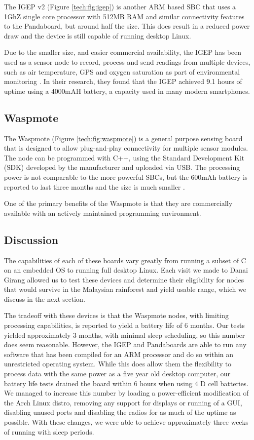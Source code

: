 The IGEP v2 (Figure \ref{tech:fig:igep}) is another ARM based SBC that uses a 1GhZ single core processor with 512MB RAM and similar connectivity features to the Pandaboard, but around half the size. This does result in a reduced power draw and the device is still capable of running desktop Linux.

Due to the smaller size, and easier commercial availability, the IGEP has been used as a sensor node to record, process and send readings from multiple devices, such as air temperature, GPS and oxygen saturation as part of environmental monitoring \cite{Resch}. In their research, they found that the IGEP achieved 9.1 hours of uptime using a 4000mAH battery, a capacity used in many modern smartphones.

\subsection{Waspmote}\label{tech:waspmote}
The Waspmote (Figure \ref{tech:fig:waspmote}) is a general purpose sensing board that is designed to allow plug-and-play connectivity for multiple sensor modules. The node can be programmed with C++, using the Standard Development Kit (SDK) developed by the manufacturer and uploaded via USB. The processing power is not comparable to the more powerful SBCs, but the 600mAh battery is reported to last three months and the size is much smaller \cite{waspmote}.

One of the primary benefits of the Waspmote is that they are commercially available with an actively maintained programming environment.

\subsection{Discussion} \label{tech:hw:conc}
The capabilities of each of these boards vary greatly from running a subset of C on an embedded OS to running full desktop Linux. Each visit we made to Danai Girang allowed us to test these devices and determine their eligibility for nodes that would survive in the Malaysian rainforest and yield usable range, which we discuss in the next section.

The tradeoff with these devices is that the Waspmote nodes, with limiting processing capabilities, is reported to yield a battery life of 6 months. Our tests yielded approximately 3 months, with minimal sleep scheduling, so this number does seem reasonable. However, the IGEP and Pandaboards are able to run any software that has been compiled for an ARM processor and do so within an unrestricted operating system. While this does allow them the flexibility to process data with the same power as a five year old desktop computer, our battery life tests drained the board within 6 hours when using 4 D cell batteries. We managed to increase this number by loading a power-efficient modification of the Arch Linux distro, removing any support for displays or running of a GUI, disabling unused ports and disabling the radios for as much of the uptime as possible. With these changes, we were able to achieve approximately three weeks of running with sleep periods.


